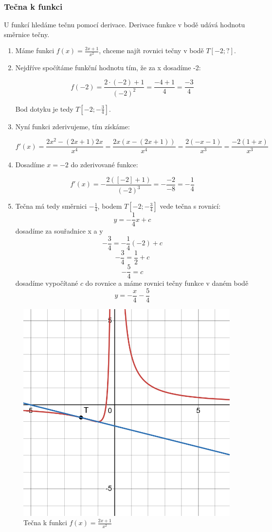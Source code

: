 \subsubsection{Tečna k funkci}
U funkcí hledáme tečnu pomocí derivace. Derivace funkce v bodě udává hodnotu směrnice tečny.
\begin{enumerate}
\item Máme funkci \( f(x) = \frac{2x + 1}{x^2} \), chceme najít rovnici tečny v bodě \( T[-2; ?] \).

\item Nejdříve spočítáme funkční hodnotu tím, že za x dosadíme -2:

\[
f(-2) = \frac{2 \cdot (-2) + 1}{(-2)^2} = \frac{-4 + 1}{4} = \frac{-3}{4}
\]

Bod dotyku je tedy \( T[-2; -\frac{3}{4}] \).

\item Nyní funkci zderivujeme, tím získáme:

\[
f'(x) = \frac{2x^2-(2x+1)2x}{x^4}= \frac{2x(x-(2x+1))}{x^4}= \frac{2(-x-1)}{x^3}= \frac{-2(1+x)}{x^3}
\]

\item Dosadíme \( x = -2 \) do zderivované funkce:

\[
f'(x) = -\frac{2([-2]+1)}{(-2)^3} = -\frac{-2}{-8} = -\frac{1}{4}
\]

\item Tečna má tedy směrnici \( -\frac{1}{4} \), bodem \( T[-2; -\frac{3}{4}] \) vede tečna s rovnicí:
\[
y = -\frac{1}{4}x +c 
\]
dosadíme za souřadnice x a y
\[
-\frac{3}{4} = -\frac{1}{4}(-2) +c 
\]
\[
-\frac{3}{4} = \frac{1}{2} +c 
\]\[
-\frac{5}{4} =c 
\]
dosadíme vypočítané $c$ do rovnice a máme rovnici tečny funkce v daném bodě
\[
y = -\frac{x}{4} - \frac{5}{4} 
\]
\end{enumerate}
    \begin{figure}[h]
        \centering
        \includegraphics[width=0.5\linewidth]{img/17_Tecna_k_funkci.png}
        \caption{Tečna k funkci \(f(x) = \frac{2x + 1}{x^2}\)}
        \label{fig:enter-label}
    \end{figure}
